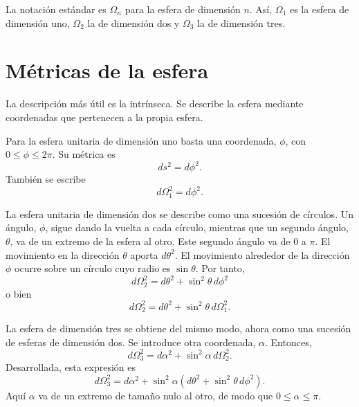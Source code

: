 La notación estándar es \(\Omega_n\) para la esfera de dimensión \(n\). Así, \(\Omega_1\) es la esfera de dimensión uno, \(\Omega_2\) la de dimensión dos y \(\Omega_3\) la de dimensión tres.

\section{Métricas de la esfera}

La descripción más útil es la intrínseca. Se describe la esfera mediante coordenadas que pertenecen a la propia esfera.

Para la esfera unitaria de dimensión uno basta una coordenada, \(\phi\), con \(0\leq \phi \leq 2\pi\). Su métrica es
\begin{equation}
ds^2=d\phi^2.
\end{equation}
También se escribe
\begin{equation}
d\Omega_1^2=d\phi^2.
\end{equation}

La esfera unitaria de dimensión dos se describe como una sucesión de círculos. Un ángulo, \(\phi\), sigue dando la vuelta a cada círculo, mientras que un segundo ángulo, \(\theta\), va de un extremo de la esfera al otro. Este segundo ángulo va de \(0\) a \(\pi\). El movimiento en la dirección \(\theta\) aporta \(d\theta^2\). El movimiento alrededor de la dirección \(\phi\) ocurre sobre un círculo cuyo radio es \(\sin\theta\). Por tanto,
\begin{equation}
d\Omega_2^2=d\theta^2+\sin^2\theta\,d\phi^2
\end{equation}
o bien
\begin{equation}
d\Omega_2^2=d\theta^2+\sin^2\theta\,d\Omega_1^2.
\end{equation}

La esfera de dimensión tres se obtiene del mismo modo, ahora como una sucesión de esferas de dimensión dos. Se introduce otra coordenada, \(\alpha\). Entonces,
\begin{equation}
d\Omega_3^2=d\alpha^2+\sin^2\alpha\,d\Omega_2^2.
\end{equation}
Desarrollada, esta expresión es
\begin{equation}
d\Omega_3^2=d\alpha^2+\sin^2\alpha\left(d\theta^2+\sin^2\theta\,d\phi^2\right).
\end{equation}
Aquí \(\alpha\) va de un extremo de tamaño nulo al otro, de modo que \(0\leq \alpha \leq \pi\).

